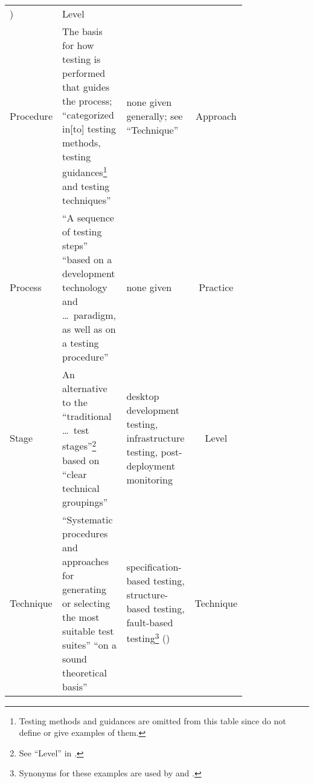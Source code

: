 \begin{paperTable}
\begin{minipage}{\linewidth}
\begin{tabular}{|>{\centering}m{0.08\linewidth}|m{0.35\linewidth}|m{0.35\linewidth}|c|}
            \citealp[p.~3]{BarbosaEtAl2006})       & Level                                                                  \\
            Procedure                              & The basis for how
            testing is performed that guides the process; ``categorized in[to] testing methods,
            testing guidances\footnote{Testing methods and guidances are omitted from this table
                since \citet{BarbosaEtAl2006} do not define or give examples of them.} and testing techniques''
            \citep[p.~3]{BarbosaEtAl2006}          & none given
            generally; see ``Technique''           & Approach                                                               \\
            Process                                & ``A sequence of
            testing steps'' \citep[p.~2]{BarbosaEtAl2006} ``based on a development technology and \dots\
            paradigm, as well as on a testing procedure''
            \citetext{p.~3}                        & none given                   & Practice                                \\
            Stage                                  & An
            alternative to the ``traditional \dots\ test stages''\footnote{See ``Level'' in
                \Cref{tab:ieeeTestTerms}.} based on ``clear technical groupings''
            \citep[p.~13]{Gerrard2000a}            & desktop development testing,
            infrastructure testing,
            post-deployment monitoring
            \citep[p.~13]{Gerrard2000a}            & Level                                                                  \\
            Technique                              & ``Systematic
            procedures and approaches for generating or selecting the most suitable test
            suites'' \citep[p.~5\=/10]{SWEBOK2024} ``on a sound theoretical basis''
            \citep[p.~3]{BarbosaEtAl2006}          & specification-based testing,
            structure-based testing, fault-based testing\footnote{Synonyms for
                these examples are used by \citet[p.~3; OG Mathur, 2012]{SouzaEtAl2017}
                and \citet[p.~3]{BarbosaEtAl2006}.}
            (\citealp[pp.~5\=/10, 5\=/13 to 5\=/15]{SWEBOK2024})
                                                   & Technique                                                              \\
            \hline
        \end{tabular}
    \end{minipage}
\end{paperTable}